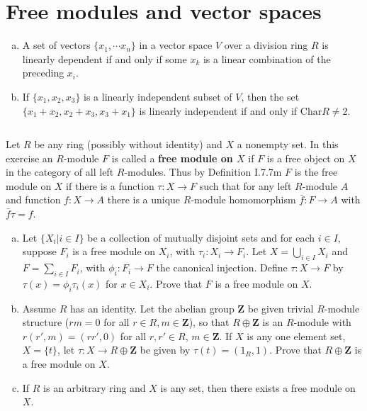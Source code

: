 \section{Free modules and vector spaces}
\begin{ex}
    \begin{enumerate}[(a)]
        \item A set of vectors $\{x_{1},\cdots x_{n}\}$ in a vector space $V$ over a division ring $R$ is linearly dependent if and only if some $x_{k}$ is a linear combination of the preceding $x_{i}$.
        \item If $\{x_{1},x_{2},x_{3}\}$ is a linearly independent subset of $V$, then the set $\{x_{1}+x_{2},x_{2}+x_{3},x_{3}+x_{1}\}$ is linearly independent if and only if $\mathrm{Char}R\neq 2$.
    \end{enumerate}
\end{ex}

$$ $$

\begin{ex}
    Let $R$ be any ring (possibly without identity) and $X$ a nonempty set. In this exercise an $R$-module $F$ is called a \textbf{free module on $X$} if $F$ is a free object on $X$ in the category of all left $R$-modules. Thus by Definition I.7.7m $F$ is the free module on $X$ if there is a function $\tau:X\to F$ such that for any left $R$-module $A$ and function $f:X\to A$ there is a unique $R$-module homomorphism $\bar{f}:F\to A$ with $\bar{f}\tau=f$.
    \begin{enumerate}[(a)]
        \item Let $\{X_{i}|i\in I\}$ be a collection of mutually disjoint sets and for each $i\in I$, suppose $F_{i}$ is a free module on $X_{i}$, with $\tau_{i}:X_{i}\to F_{i}$. Let $X=\bigcup\limits_{i\in I}X_{i}$ and $F=\sum\limits_{i\in I}F_{i}$, with $\phi_{i}:F_{i}\to F$ the canonical injection. Define $\tau:X\to F$ by $\tau(x)=\phi_{i}\tau_{i}(x)$ for $x\in X_{i}$. Prove that $F$ is a free module on $X$.
        \item Assume $R$ has an identity. Let the abelian group $\mathbf{Z}$ be given trivial $R$-module structure ($rm=0$ for all $r\in R, m\in\mathbf{Z}$), so that $R\oplus\mathbf{Z}$ is an $R$-module with $r(r',m)=(rr',0)$ for all $r,r'\in R$, $m\in \mathbf{Z}$. If $X$ is any one element set, $X=\{t\}$, let $\tau:X\to R\oplus\mathbf{Z}$ be given by $\tau(t)=(1_{R},1)$. Prove that $R\oplus\mathbf{Z}$ is a free module on $X$.
        \item If $R$ is an arbitrary ring and $X$ is any set, then there exists a free module on $X$.
    \end{enumerate}
\end{ex}

